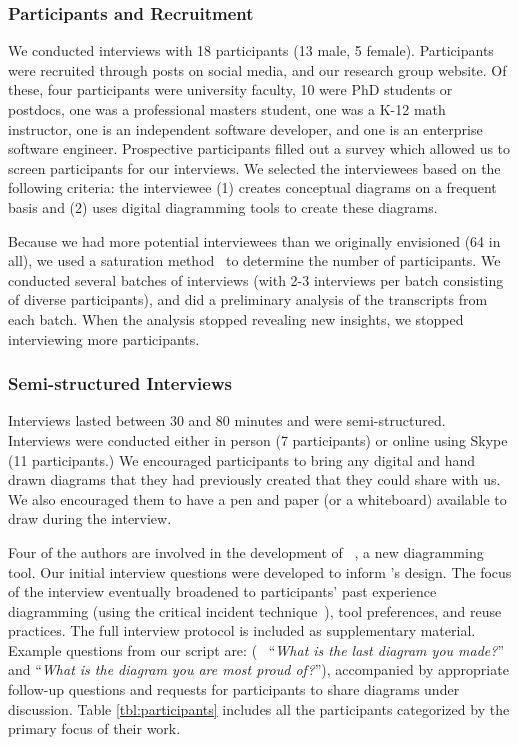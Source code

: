 \subsubsection{Participants and Recruitment} 
We conducted interviews with 18 participants (13 male, 5 female). Participants were recruited through posts on social media, and our research group website. Of these, four participants were university faculty, 10 were PhD students or postdocs, one was a professional masters student, one was a K-12 math instructor, one is an independent software developer, and one is an enterprise software engineer. Prospective participants filled out a survey which allowed us to screen participants for our interviews. We selected the interviewees based on the following criteria: the interviewee (1) creates conceptual diagrams on a frequent basis and (2) uses digital diagramming tools to create these diagrams. 

Because we had more potential interviewees than we originally envisioned (64 in all), we used a saturation method~\cite{socialResearchMethods} to determine the number of participants. We conducted several batches of interviews (with 2-3 interviews per batch consisting of diverse participants), and did a preliminary analysis of the transcripts from each batch. When the analysis stopped revealing new insights, we stopped interviewing more participants. 

\subsubsection{Semi-structured Interviews}
 
Interviews lasted between 30 and 80 minutes and were semi-structured. Interviews were conducted either in person (7 participants) or online using Skype (11 participants.) We encouraged participants to bring any digital and hand drawn diagrams that they had previously created that they could share with us. We also encouraged them to have a pen and paper (or a whiteboard) available to draw during the interview. 

Four of the authors are involved in the development of \Penrose{}~\cite{DSLDI, OBT}, a new diagramming tool. Our initial interview questions were developed to inform \Penrose{}'s design. The focus of the interview eventually broadened to participants' past experience diagramming (using the critical incident technique~\cite{criticalIncident}), tool preferences, and reuse practices. The full interview protocol is included as supplementary material. Example questions from our script are: (\eg{}~ ``\textit{What is the last diagram you made?}'' and ``\textit{What is the diagram you are most proud of?}''), accompanied by appropriate follow-up questions and requests for participants to share diagrams under discussion. Table \ref{tbl:participants} includes all the participants categorized by the primary focus of their work.

